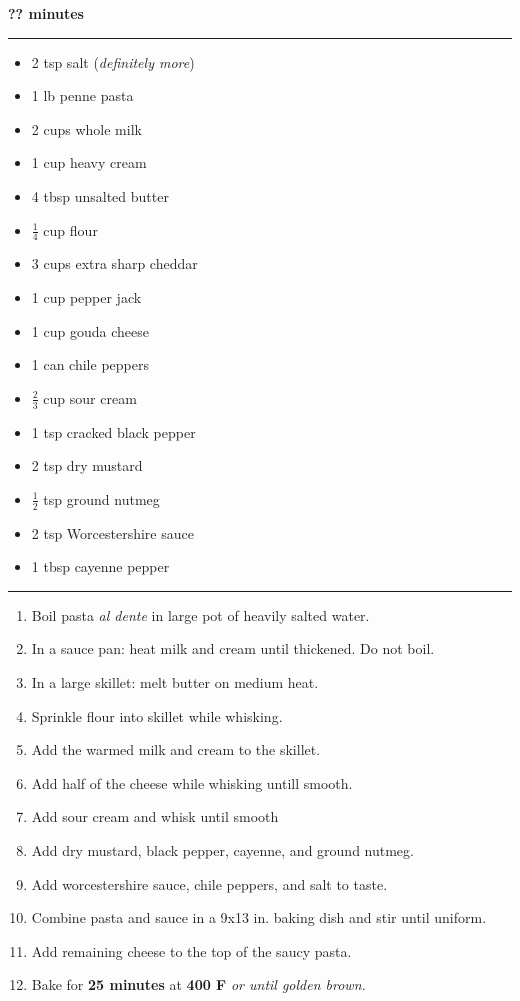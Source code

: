  \hfill {\large \textbf{?? minutes}}

\vspace{15pt} \hrule \vspace{15pt}
\begin{itemize}
	\item 2 tsp salt (\textit{definitely more})
	\item 1 lb penne pasta
	\item 2 cups whole milk
	\item 1 cup heavy cream
	\item 4 tbsp unsalted butter
	\item $\frac{1}{4}$ cup flour
	\item 3 cups extra sharp cheddar
	\item 1 cup pepper jack
	\item 1 cup gouda cheese
	\item 1 can chile peppers
	\item $\frac{2}{3}$ cup sour cream
	\item 1 tsp cracked black pepper
	\item 2 tsp dry mustard
	\item $\frac{1}{2}$ tsp ground nutmeg
	\item 2 tsp Worcestershire sauce
	\item 1 tbsp cayenne pepper
\end{itemize}

\vspace{15pt} \hrule \vspace{15pt}
\begin{enumerate}
	\item Boil pasta \textit{al dente} in large pot of heavily salted water.
	\item In a sauce pan: heat milk and cream until thickened. Do not boil.
	\item In a large skillet: melt butter on medium heat.
	\item Sprinkle flour into skillet while whisking.
	\item Add the warmed milk and cream to the skillet.
	\item Add half of the cheese while whisking untill smooth.
	\item Add sour cream and whisk until smooth
	\item Add dry mustard, black pepper, cayenne, and ground nutmeg.
	\item Add worcestershire sauce, chile peppers, and salt to taste.
	\item Combine pasta and sauce in a 9x13 in. baking dish and stir until uniform.
	\item Add remaining cheese to the top of the saucy pasta.
	\item Bake for \textbf{25 minutes} at \textbf{400 F} \textit{or until golden brown.}
\end{enumerate}
